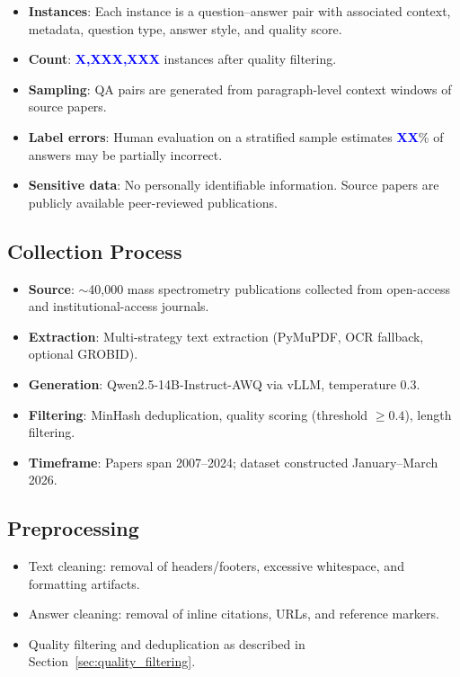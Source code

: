 \documentclass[11pt]{article}
\newcommand{\placeholder}[1]{\textcolor{blue}{\textbf{#1}}}
\begin{document}
\begin{itemize}[leftmargin=*,itemsep=2pt]
    \item \textbf{Instances}: Each instance is a question--answer pair with associated context, metadata, question type, answer style, and quality score.
    \item \textbf{Count}: \placeholder{X,XXX,XXX} instances after quality filtering.
    \item \textbf{Sampling}: QA pairs are generated from paragraph-level context windows of source papers.
    \item \textbf{Label errors}: Human evaluation on a stratified sample estimates \placeholder{XX}\% of answers may be partially incorrect.
    \item \textbf{Sensitive data}: No personally identifiable information. Source papers are publicly available peer-reviewed publications.
\end{itemize}

\subsection{Collection Process}

\begin{itemize}[leftmargin=*,itemsep=2pt]
    \item \textbf{Source}: $\sim$40,000 mass spectrometry publications collected from open-access and institutional-access journals.
    \item \textbf{Extraction}: Multi-strategy text extraction (PyMuPDF, OCR fallback, optional GROBID).
    \item \textbf{Generation}: Qwen2.5-14B-Instruct-AWQ via vLLM, temperature 0.3.
    \item \textbf{Filtering}: MinHash deduplication, quality scoring (threshold $\geq 0.4$), length filtering.
    \item \textbf{Timeframe}: Papers span 2007--2024; dataset constructed January--March 2026.
\end{itemize}

\subsection{Preprocessing}

\begin{itemize}[leftmargin=*,itemsep=2pt]
    \item Text cleaning: removal of headers/footers, excessive whitespace, and formatting artifacts.
    \item Answer cleaning: removal of inline citations, URLs, and reference markers.
    \item Quality filtering and deduplication as described in Section~\ref{sec:quality_filtering}.
\end{itemize}
\end{document}
